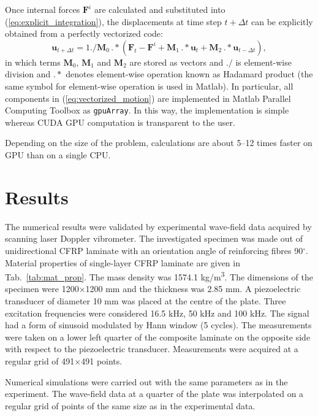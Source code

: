 \documentclass[runningheads]{llncs}
\renewcommand{\vec}[1]{\mathbf{#1}}
\begin{document}
Once internal forces \(\vec{F}^i\) are calculated and substituted into (\ref{eq:explicit_integration}), the displacements at time step \(t+\Delta t\) can be explicitly obtained from a perfectly vectorized code:
\begin{equation}
\vec{u}_{t+\Delta t}=1./\vec{M}_0\, .*\left(\vec{F}_t - \vec{F}^i +\vec{M}_1 \, .* \vec{u}_t +\vec{M}_2 \, .* \vec{u}_{t-\Delta t}\right),
\label{eq:vectorized_motion}
\end{equation} 
in which terms \(\vec{M}_0\), \(\vec{M}_1\) and \(\vec{M}_2\) are stored as vectors and \(./\) is element-wise division  and \(.*\) denotes element-wise operation known as Hadamard product (the same symbol for element-wise operation is used in Matlab). 
In particular, all components in (\ref{eq:vectorized_motion}) are implemented in Matlab Parallel Computing Toolbox as \verb|gpuArray|. 
In this way, the implementation is simple whereas CUDA GPU computation is transparent to the user. 

Depending on the size of the problem,  calculations are about 5--12 times faster on GPU than on a single CPU.

\section{Results}
The numerical results were validated by experimental wave-field data acquired by scanning laser Doppler vibrometer.
The investigated specimen was made out of unidirectional CFRP laminate with an orientation angle of reinforcing fibres 90\(^{\circ}\).
Material properties of single-layer CFRP laminate are given in Tab.~\ref{tab:mat_prop}.
The mass density was 1574.1 kg/m\textsuperscript{3}.
The dimensions of the specimen were 1200\(\times\)1200 mm and the thickness was 2.85 mm.
A piezoelectric transducer of diameter 10 mm was placed at the centre of the plate. 
Three excitation frequencies were considered 16.5 kHz, 50 kHz and 100 kHz.
The signal had a form of sinusoid modulated by Hann window (5 cycles).
The measurements were taken on a lower left quarter of the composite laminate on the opposite side with respect to the piezoelectric transducer.
Measurements were acquired at a regular grid of 491\(\times\)491 points.

Numerical simulations were carried out with the same parameters as in the experiment.
The wave-field data at a quarter of the plate was interpolated on a regular grid of points of the same size as in the experimental data.
\end{document}

